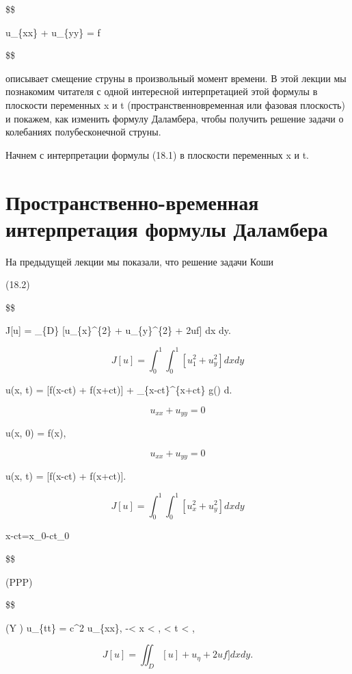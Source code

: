 \documentclass[
  ukrainian,
]{article}
\begin{document}
\$\$

u\_\{xx\} + u\_\{yy\} = f

\$\$

описывает смещение струны в произвольный момент времени. В этой лекции
мы познакомим читателя с одной интересной интерпретацией этой формулы в
плоскости переменных x и t (пространственновременная или фазовая
плоскость) и покажем, как изменить формулу Даламбера, чтобы получить
решение задачи о колебаниях полубесконечной струны.

Начнем с интерпретации формулы (18.1) в плоскости переменных x и t.

\section{Пространственно-временная интерпретация формулы
Даламбера}\label{ux43fux440ux43eux441ux442ux440ux430ux43dux441ux442ux432ux435ux43dux43dux43e-ux432ux440ux435ux43cux435ux43dux43dux430ux44f-ux438ux43dux442ux435ux440ux43fux440ux435ux442ux430ux446ux438ux44f-ux444ux43eux440ux43cux443ux43bux44b-ux434ux430ux43bux430ux43cux431ux435ux440ux430}

На предыдущей лекции мы показали, что решение задачи Коши

(18.2)

\$\$

J{[}u{]} = \iint\_\{D\} {[}u\_\{x\}\^{}\{2\} + u\_\{y\}\^{}\{2\} +
2uf{]} dx dy.

\[ J[u] = \int_{0}^{1} \int_{0}^{1} \left[ u_{1}^{2} + u_{y}^{2} \right] dx dy
\]

u(x, t) =  {[}f(x-ct) + f(x+ct){]} + 
\int\_\{x-ct\}\^{}\{x+ct\} g(\xi) d\xi.

\[ u_{xx} + u_{yy} = 0
\]

u(x, 0) = f(x),

\[ u_{xx} + u_{yy} = 0
\]

u(x, t) =  {[}f(x-ct) + f(x+ct){]}.

\[ J[u] = \int_{0}^{1} \int_{0}^{1} \left[ u_{x}^{2} + u_{y}^{2} \right] dx dy
\]

x-ct=x\_0-ct\_0

\$\$

(PPP)

\$\$

(Y ) \qquad u\_\{tt\} = c\^{}2 u\_\{xx\},
\quad -\infty \textless{} x \textless{} \infty,  \textless{} t
\textless{} \infty,

\[ J[u] = \iint_{D} [u] + u_{\eta} + 2uf ] dx dy.
\]
\end{document}
